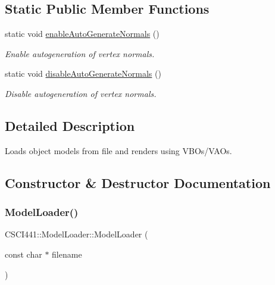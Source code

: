 \subsection*{Static Public Member Functions}
\begin{DoxyCompactItemize}
\item 
static void \hyperlink{class_c_s_c_i441_1_1_model_loader_a202848314c149e59b5211858ff082072}{enable\+Auto\+Generate\+Normals} ()
\begin{DoxyCompactList}\small\item\em Enable autogeneration of vertex normals. \end{DoxyCompactList}\item 
static void \hyperlink{class_c_s_c_i441_1_1_model_loader_aaf1ec38a0f551569ccf1a47af2a561f3}{disable\+Auto\+Generate\+Normals} ()
\begin{DoxyCompactList}\small\item\em Disable autogeneration of vertex normals. \end{DoxyCompactList}\end{DoxyCompactItemize}


\subsection{Detailed Description}
Loads object models from file and renders using V\+B\+Os/\+V\+A\+Os. 

\subsection{Constructor \& Destructor Documentation}
\mbox{\label{class_c_s_c_i441_1_1_model_loader_a1223befa1c79f54b33a48a13efd8f639}} 
\subsubsection{\texorpdfstring{Model\+Loader()}{ModelLoader()}}
{\footnotesize\ttfamily C\+S\+C\+I441\+::\+Model\+Loader\+::\+Model\+Loader (\begin{DoxyParamCaption}\item[{const char $\ast$}]{filename }\end{DoxyParamCaption})}



